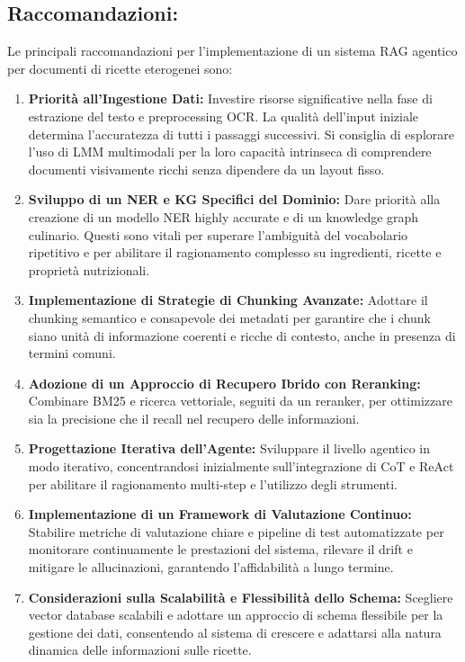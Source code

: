 \documentclass[a4paper, 11pt]{article}
\begin{document}
\subsection*{Raccomandazioni:}
Le principali raccomandazioni per l'implementazione di un sistema RAG agentico per documenti di ricette eterogenei sono:
\begin{enumerate}[label=\arabic*.]
    \item \textbf{Priorità all'Ingestione Dati:} Investire risorse significative nella fase di estrazione del testo e preprocessing OCR. La qualità dell'input iniziale determina l'accuratezza di tutti i passaggi successivi. Si consiglia di esplorare l'uso di LMM multimodali per la loro capacità intrinseca di comprendere documenti visivamente ricchi senza dipendere da un layout fisso.
    \item \textbf{Sviluppo di un NER e KG Specifici del Dominio:} Dare priorità alla creazione di un modello NER highly accurate e di un knowledge graph culinario. Questi sono vitali per superare l'ambiguità del vocabolario ripetitivo e per abilitare il ragionamento complesso su ingredienti, ricette e proprietà nutrizionali.
    \item \textbf{Implementazione di Strategie di Chunking Avanzate:} Adottare il chunking semantico e consapevole dei metadati per garantire che i chunk siano unità di informazione coerenti e ricche di contesto, anche in presenza di termini comuni.
    \item \textbf{Adozione di un Approccio di Recupero Ibrido con Reranking:} Combinare BM25 e ricerca vettoriale, seguiti da un reranker, per ottimizzare sia la precisione che il recall nel recupero delle informazioni.
    \item \textbf{Progettazione Iterativa dell'Agente:} Sviluppare il livello agentico in modo iterativo, concentrandosi inizialmente sull'integrazione di CoT e ReAct per abilitare il ragionamento multi-step e l'utilizzo degli strumenti.
    \item \textbf{Implementazione di un Framework di Valutazione Continuo:} Stabilire metriche di valutazione chiare e pipeline di test automatizzate per monitorare continuamente le prestazioni del sistema, rilevare il drift e mitigare le allucinazioni, garantendo l'affidabilità a lungo termine.
    \item \textbf{Considerazioni sulla Scalabilità e Flessibilità dello Schema:} Scegliere vector database scalabili e adottare un approccio di schema flessibile per la gestione dei dati, consentendo al sistema di crescere e adattarsi alla natura dinamica delle informazioni sulle ricette.
\end{enumerate}



\end{document}
